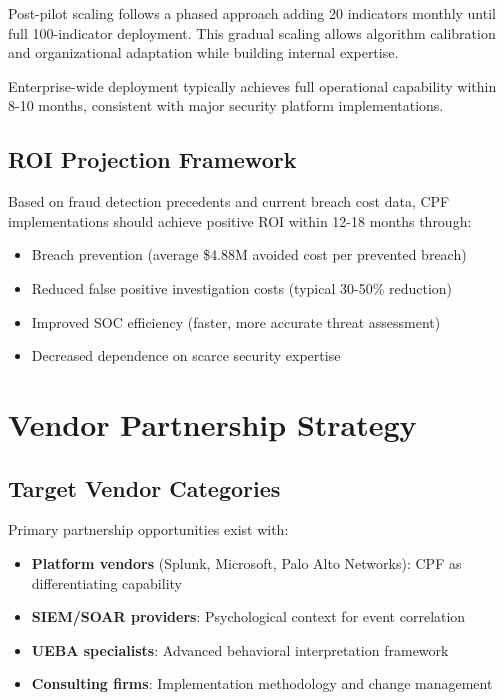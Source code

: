 \documentclass[11pt,a4paper]{article}
\begin{document}
Post-pilot scaling follows a phased approach adding 20 indicators monthly until full 100-indicator deployment. This gradual scaling allows algorithm calibration and organizational adaptation while building internal expertise.

Enterprise-wide deployment typically achieves full operational capability within 8-10 months, consistent with major security platform implementations.

\subsection{ROI Projection Framework}

Based on fraud detection precedents and current breach cost data, CPF implementations should achieve positive ROI within 12-18 months through:
\begin{itemize}
\item Breach prevention (average \$4.88M avoided cost per prevented breach)
\item Reduced false positive investigation costs (typical 30-50\% reduction)
\item Improved SOC efficiency (faster, more accurate threat assessment)
\item Decreased dependence on scarce security expertise
\end{itemize}

\section{Vendor Partnership Strategy}

\subsection{Target Vendor Categories}

Primary partnership opportunities exist with:
\begin{itemize}
\item \textbf{Platform vendors} (Splunk, Microsoft, Palo Alto Networks): CPF as differentiating capability
\item \textbf{SIEM/SOAR providers}: Psychological context for event correlation
\item \textbf{UEBA specialists}: Advanced behavioral interpretation framework
\item \textbf{Consulting firms}: Implementation methodology and change management
\end{itemize}
\end{document}
